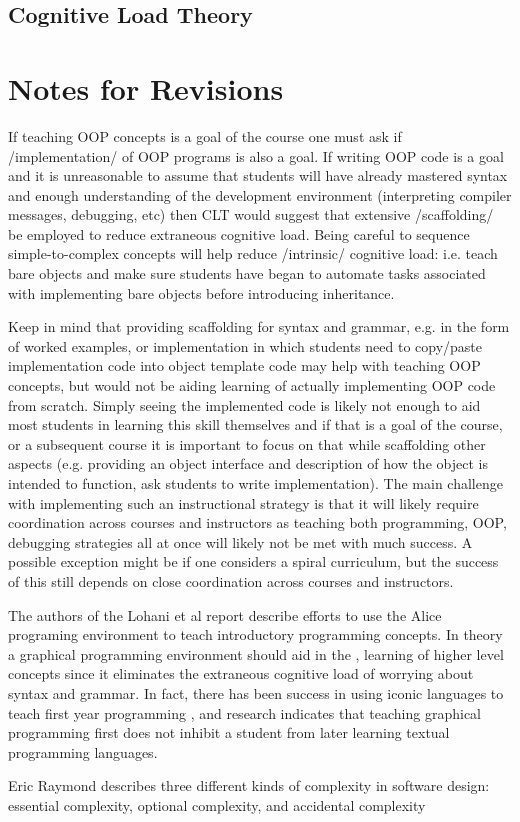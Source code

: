 \documentclass[12pt]{article}
\let\textcite=\autocite
\begin{document}

\subsection{Cognitive Load Theory}


\section{Notes for Revisions}

If teaching OOP concepts is a goal of the course one must ask if
/implementation/ of OOP programs is also a goal.  If writing OOP code
is a goal and it is unreasonable to assume that students will have
already mastered syntax and enough understanding of the development
environment (interpreting compiler messages, debugging, etc) then CLT
would suggest that extensive /scaffolding/ be employed to reduce
extraneous cognitive load. Being careful to sequence simple-to-complex
concepts will help reduce /intrinsic/ cognitive load: i.e. teach bare
objects and make sure students have began to automate tasks associated
with implementing bare objects before introducing inheritance.

Keep in mind that providing scaffolding for syntax and grammar,
e.g. in the form of worked examples, or implementation in which
students need to copy/paste implementation code into object template
code may help with teaching OOP concepts, but would not be aiding
learning of actually implementing OOP code from scratch. Simply seeing
the implemented code is likely not enough to aid most students in
learning this skill themselves and if that is a goal of the course, or
a subsequent course it is important to focus on that while scaffolding
other aspects (e.g. providing an object interface and description of
how the object is intended to function, ask students to write
implementation). The main challenge with implementing such an
instructional strategy is that it will likely require coordination
across courses and instructors as teaching both programming, OOP,
debugging strategies all at once will likely not be met with much
success. A possible exception might be if one considers a spiral
curriculum, but the success of this still depends on close
coordination across courses and instructors.

The authors of the Lohani et al report describe efforts to use the
Alice programing environment to teach introductory programming
concepts\autocite{lohani_reformulating_2011}. In theory a graphical
programming environment should aid in the , learning of higher level
concepts since it eliminates the extraneous cognitive load of worrying
about syntax and grammar. In fact, there has been success in using
iconic languages to teach first year programming
\autocite{calloni_iconic_1997}, and research indicates that teaching
graphical programming first does not inhibit a student from later
learning textual programming languages\autocite{hundhausen_can_2009}.

Eric Raymond describes three different kinds of complexity in software
design: essential complexity, optional complexity, and accidental
complexity

\vspace{4\baselineskip}\vspace{-\parskip} %

\printbibliography
\end{document}
